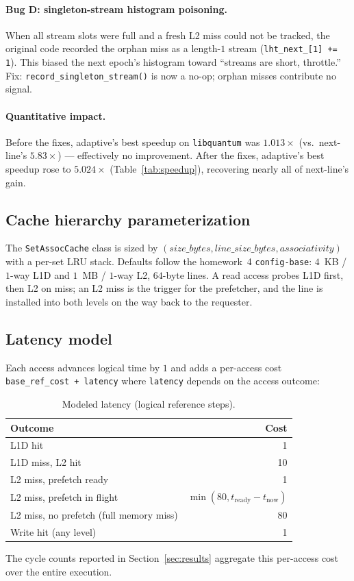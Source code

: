 \documentclass[11pt,letterpaper]{article}
\begin{document}
\paragraph{Bug D: singleton-stream histogram poisoning.}
When all stream slots were full and a fresh L2 miss could not be tracked,
the original code recorded the orphan miss as a length-$1$ stream
(\texttt{lht\_next\_[1] += 1}). This biased the next epoch's histogram
toward ``streams are short, throttle.'' Fix: \texttt{record\_singleton\_stream()}
is now a no-op; orphan misses contribute no signal.

\paragraph{Quantitative impact.}
Before the fixes, adaptive's best speedup on \texttt{libquantum} was
$1.013\times$ (vs.\ next-line's $5.83\times$) --- effectively no
improvement. After the fixes, adaptive's best speedup rose to
$5.024\times$ (Table~\ref{tab:speedup}), recovering nearly all of
next-line's gain.

\subsection{Cache hierarchy parameterization}
The \texttt{SetAssocCache} class is sized by
$(\textit{size\_bytes}, \textit{line\_size\_bytes}, \textit{associativity})$
with a per-set LRU stack. Defaults follow the homework~4 \texttt{config-base}:
$4$~KB / $1$-way L1D and $1$~MB / $1$-way L2, $64$-byte lines. A read access
probes L1D first, then L2 on miss; an L2 miss is the trigger for the
prefetcher, and the line is installed into both levels on the way back to
the requester.

\subsection{Latency model}
Each access advances logical time by $1$ and adds a per-access cost
\texttt{base\_ref\_cost~+~latency} where \texttt{latency} depends on the
access outcome:

\begin{table}[H]
\centering
\caption{Modeled latency (logical reference steps).}
\begin{tabular}{lr}
\toprule
Outcome & Cost \\
\midrule
L1D hit                                  & 1 \\
L1D miss, L2 hit                         & 10 \\
L2 miss, prefetch ready                  & 1 \\
L2 miss, prefetch in flight              & $\min(80, t_{\text{ready}}-t_{\text{now}})$ \\
L2 miss, no prefetch (full memory miss)  & 80 \\
Write hit (any level)                    & 1 \\
\bottomrule
\end{tabular}
\end{table}
The cycle counts reported in Section~\ref{sec:results} aggregate this per-access
cost over the entire execution.
\end{document}
